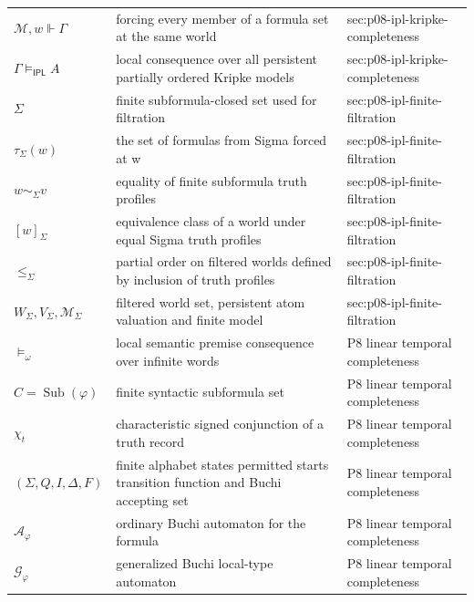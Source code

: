 \begin{longtable}{@{}p{}p{}p{}@{}}
\(\mathcal M,\allowbreak w\Vdash\Gamma\) & forcing every member of a formula set at the same world & sec:\allowbreak{}p08-\allowbreak{}ipl-\allowbreak{}kripke-\allowbreak{}completeness \\
\(\Gamma\models_{\mathsf{IPL}}A\) & local consequence over all persistent partially ordered Kripke models & sec:\allowbreak{}p08-\allowbreak{}ipl-\allowbreak{}kripke-\allowbreak{}completeness \\
\(\Sigma\) & finite subformula-closed set used for filtration & sec:\allowbreak{}p08-\allowbreak{}ipl-\allowbreak{}finite-\allowbreak{}filtration \\
\(\tau_\Sigma(w)\) & the set of formulas from Sigma forced at w & sec:\allowbreak{}p08-\allowbreak{}ipl-\allowbreak{}finite-\allowbreak{}filtration \\
\(w\sim_\Sigma v\) & equality of finite subformula truth profiles & sec:\allowbreak{}p08-\allowbreak{}ipl-\allowbreak{}finite-\allowbreak{}filtration \\
\([w]_\Sigma\) & equivalence class of a world under equal Sigma truth profiles & sec:\allowbreak{}p08-\allowbreak{}ipl-\allowbreak{}finite-\allowbreak{}filtration \\
\(\leq_\Sigma\) & partial order on filtered worlds defined by inclusion of truth profiles & sec:\allowbreak{}p08-\allowbreak{}ipl-\allowbreak{}finite-\allowbreak{}filtration \\
\(W_\Sigma,\allowbreak V_\Sigma,\allowbreak \mathcal M_\Sigma\) & filtered world set, persistent atom valuation and finite model & sec:\allowbreak{}p08-\allowbreak{}ipl-\allowbreak{}finite-\allowbreak{}filtration \\
\(\models_\omega\) & local semantic premise consequence over infinite words & P8 linear temporal completeness \\
\(C=\operatorname{Sub}(\varphi)\) & finite syntactic subformula set & P8 linear temporal completeness \\
\(\chi_t\) & characteristic signed conjunction of a truth record & P8 linear temporal completeness \\
\((\Sigma,\allowbreak Q,\allowbreak I,\allowbreak \Delta,\allowbreak F)\) & finite alphabet states permitted starts transition function and Buchi accepting set & P8 linear temporal completeness \\
\(\mathcal A_\varphi\) & ordinary Buchi automaton for the formula & P8 linear temporal completeness \\
\(\mathcal G_\varphi\) & generalized Buchi local-type automaton & P8 linear temporal completeness \\

\end{longtable}

